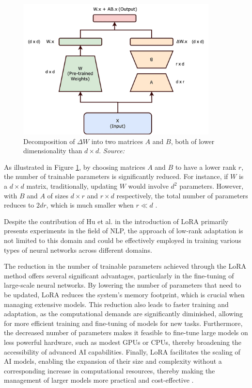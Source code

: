 \begin{figure}[h]
    \centering
    \includegraphics[width=0.9\textwidth]{images/llms/lora.png}
    \caption{Decomposition of \( \Delta W \) into two matrices \( A \) and \( B \), both of lower dimensionality than \( d \times d \). \textit{Source:} \cite{towardsdatascience2024lora}}
    \label{fig:lora_decomposition}
\end{figure}

As illustrated in Figure \ref{fig:lora_decomposition}, by choosing matrices \( A \) and \( B \) to have a lower rank \( r \), the number of trainable parameters is significantly reduced. For instance, if \( W \) is a \( d \times d \) matrix, traditionally, updating \( W \) would involve \( d^2 \) parameters. However, with \( B \) and \( A \) of sizes \( d \times r \) and \( r \times d \) respectively, the total number of parameters reduces to \( 2dr \), which is much smaller when \( r \ll d \) \cite{hu2021lora}. 

Despite the contribution of Hu et al. \cite{hu2021lora} in the introduction of LoRA primarily presents experiments in the field of NLP, the approach of low-rank adaptation is not limited to this domain and could be effectively employed in training various types of neural networks across different domains. \newline

The reduction in the number of trainable parameters achieved through the LoRA method offers several significant advantages, particularly in the fine-tuning of large-scale neural networks. By lowering the number of parameters that need to be updated, LoRA reduces the system's memory footprint, which is crucial when managing extensive models. This reduction also leads to faster training and adaptation, as the computational demands are significantly diminished, allowing for more efficient training and fine-tuning of models for new tasks. Furthermore, the decreased number of parameters makes it feasible to fine-tune large models on less powerful hardware, such as modest GPUs or CPUs, thereby broadening the accessibility of advanced AI capabilities. Finally, LoRA facilitates the scaling of AI models, enabling the expansion of their size and complexity without a corresponding increase in computational resources, thereby making the management of larger models more practical and cost-effective \cite{towardsdatascience2024lora}.

